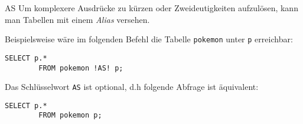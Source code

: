 \begin{sql}{AS}
    Um komplexere Ausdrücke zu kürzen oder Zweideutigkeiten aufzulösen, kann man Tabellen mit einem \emph{Alias} versehen.

    Beispielsweise wäre im folgenden Befehl die Tabelle \texttt{pokemon} unter \texttt{p} erreichbar:

    \begin{lstlisting}[language=mysql]
        SELECT p.*
        FROM pokemon !AS! p;
    \end{lstlisting}

    Das Schlüsselwort \texttt{AS} ist optional, d.h folgende Abfrage ist äquivalent:
    
    \begin{lstlisting}[language=mysql]
        SELECT p.*
        FROM pokemon p;
    \end{lstlisting}
\end{sql}

